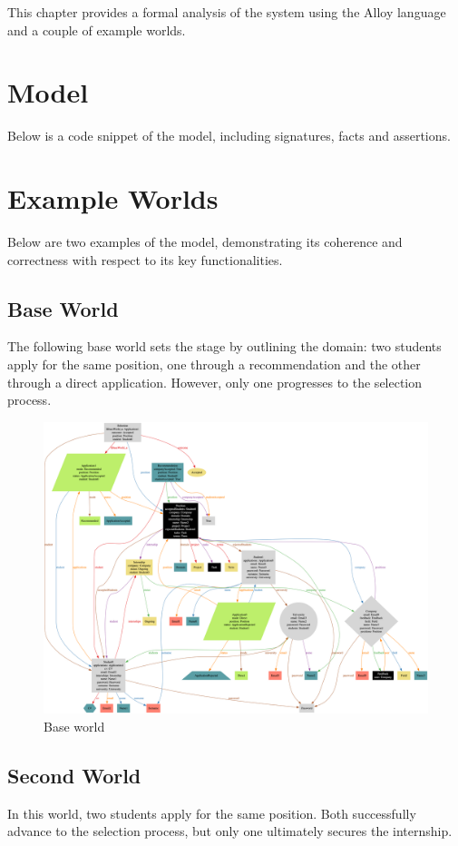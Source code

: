 This chapter provides a formal analysis of the system using the Alloy language and a couple of example worlds.

\section{Model}
Below is a code snippet of the model, including signatures, facts and assertions.



\section{Example Worlds}
Below are two examples of the model, demonstrating its coherence and correctness with respect to its key functionalities.

\subsection{Base World}
The following base world sets the stage by outlining the domain: two students apply for the same position, one through a recommendation and the other through a direct application.
However, only one progresses to the selection process.

\begin{figure}[h]
    \centering
    \includegraphics[width=16cm]{images/worlds/base.png}
    \caption{Base world}
\end{figure}

\subsection{Second World}
In this world, two students apply for the same position. Both successfully advance to the selection process, but only one ultimately secures the internship.


